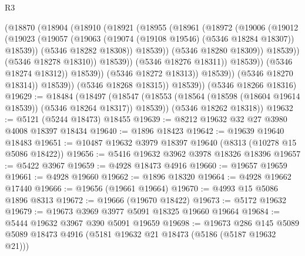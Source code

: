 \begin{lexlean}{R3}
\begin{coremodule}
                                (@18870
                                  (@18904
                                    (@18910
                                      (@18921
                                        (@18955
                                          (@18961
                                            (@18972
                                              (@19006
                                                (@19012
                                                  (@19023
                                                    (@19057
                                                      (@19063
                                                        (@19074
                                                          (@19108 @19546)
                                                          (@5346 @18284 @18307))
                                                        @18539))
                                                    (@5346 @18282 @18308))
                                                  @18539))
                                              (@5346 @18280 @18309))
                                            @18539))
                                        (@5346 @18278 @18310))
                                      @18539))
                                  (@5346 @18276 @18311))
                                @18539))
                            (@5346 @18274 @18312))
                          @18539))
                      (@5346 @18272 @18313))
                    @18539))
                (@5346 @18270 @18314))
              @18539))
          (@5346 @18268 @18315))
        @18539))
    (@5346 @18266 @18316)
@19629 := @18484
    (@18497
      (@18547 (@18553 (@18564 (@18598 (@18604 @19614 @18539)) (@5346 @18264 @18317)) @18539))
      (@5346 @18262 @18318))
@19632 := @5121 (@5244 @18473) @18455
@19639 := @8212 @19632 @32 @27 @3980 @4008 @18397 @18434
@19640 := @1896 @18423
@19642 := @19639 @19640 @18483
@19651 := @10487 @19632 @3979 @18397 @19640 (@8313 (@10278 @15 @5086 @18422))
@19656 := @5416 @19632 @3962 @3978 @18326 @18396
@19657 := @5422 @3967
@19659 := @4928 @18473 @4916
@19660 := @19657 @19659
@19661 := @4928 @19660
@19662 := @1896 @18320
@19664 := @4928 @19662 @17440
@19666 := @19656 (@19661 @19664)
@19670 := @4993 @15 @5086 @1896 @8313
@19672 := @19666 (@19670 @18422)
@19673 := @5172 @19632
@19679 := @19673 @3969 @3977 @5091 @18325 @19660 @19664
@19684 := @5444 @19632 @3967 @390 @5091 @19659
@19698 := @19673
    @286
    @145
    @5089
    @5089
    @18473
    @4916
    (@5181 @19632 @21 @18473 (@5186 (@5187 @19632 @21)))

\end{coremodule}
\end{lexlean}
